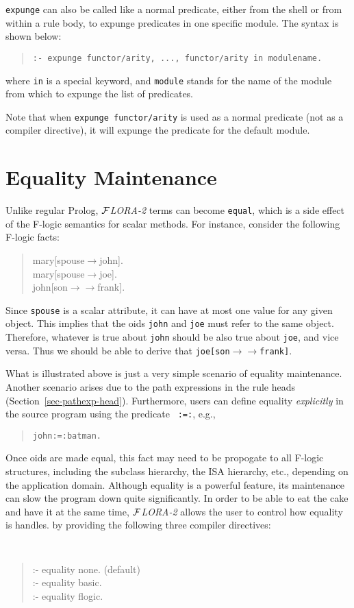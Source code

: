 \documentclass[11pt]{article}
\newcommand{\fd}{\ensuremath{{\rightarrow}}}                   %
\newcommand{\mvd}{\ensuremath{{\rightarrow\!\!\!\!\rightarrow}}}  %
\newcommand{\FLORA}{{\mbox{${\cal F}${\small\it LORA}\rm\emph{-2}}}\xspace}
\newcommand{\fl}{\mbox{F-logic}\xspace}
\begin{document}
\noindent
{\tt expunge} can also be called like a normal predicate,
either from the shell or from within a rule body, to expunge
predicates in one specific module. The syntax is shown below:
\begin{quote}
\verb!:- expunge functor/arity, ..., functor/arity in modulename.!
\end{quote}
where {\tt in} is a special keyword, and {\tt module} stands for the
name of the module from which to expunge the list of predicates.

Note that when {\tt expunge functor/arity} is used as a normal predicate
(not as a compiler directive), it will expunge the predicate for the
default module.




\section{Equality Maintenance}\label{sec-eqmaintain}


Unlike regular Prolog, \FLORA terms can become {\tt equal}, which is a side
effect of the \fl semantics for scalar methods.  For instance, consider the
following \fl facts:
\begin{quote}
mary[spouse{\fd}john]. \\
mary[spouse{\fd}joe]. \\
john[son{\mvd}frank].
\end{quote}
Since {\tt spouse} is a scalar attribute, it can have at most one value for
any given object. This implies that the oids {\tt john} and {\tt joe} must
refer to the same object. Therefore, whatever is true about {\tt john}
should be also true about {\tt joe}, and vice versa.  Thus we should be
able to derive that {\tt joe[son{\mvd}frank]}.

What is illustrated above is just a very simple scenario of equality
maintenance. Another scenario arises due to the path expressions in the
rule heads (Section~\ref{sec-pathexp-head}).  Furthermore, users can define
equality \emph{explicitly} in the source program using the predicate {\tt
  :=:}, e.g.,
\begin{quote}
\verb|john:=:batman.|
\end{quote}

Once oids are made equal, this fact may need to be propogate to all \fl
structures, including the subclass hierarchy, the ISA hierarchy, etc.,
depending on the application domain. Although equality is a powerful
feature, its maintenance can slow the program down quite significantly.
In order to be able to eat the cake and have it at the same time, \FLORA
allows the user to control how equality is handles.
by providing the following three compiler directives:
{\tt
\begin{quote}
:- equality none.  (default)\\
:- equality basic.\\
:- equality flogic.
\end{quote}
}
\end{document}
